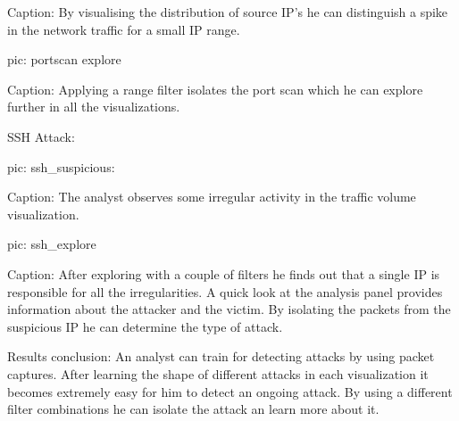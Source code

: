 Caption: By visualising the distribution of source IP's he can distinguish a spike in the network traffic for a small IP range.

pic: portscan explore

Caption: Applying a range filter isolates the port scan which he can explore further in all the visualizations.


SSH Attack:

pic: ssh_suspicious:

Caption: The analyst observes some irregular activity in the traffic volume visualization.

pic: ssh_explore

Caption: After exploring with a couple of filters he finds out that a single IP is responsible for all the irregularities. A quick look at the analysis panel provides information about the attacker and the victim. By isolating the packets from the suspicious IP he can determine the type of attack.

Results conclusion:
An analyst can train for detecting attacks by using packet captures. After learning the shape of different attacks in each visualization it becomes extremely easy for him to detect an ongoing attack. By using a different filter combinations he can isolate the attack an learn more about it.


